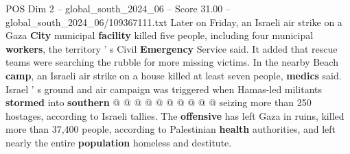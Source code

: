 \begin{textsample}{POS Dim 2 – global\_south\_2024\_06 – Score 31.00 – global\_south\_2024\_06/109367111.txt}
Later on Friday, an Israeli air strike on a Gaza \textbf{City} municipal \textbf{facility} killed five people, including four municipal \textbf{workers}, the territory ' s Civil \textbf{Emergency} Service said.
It added that rescue teams were searching the rubble for more missing victims.
In the nearby Beach \textbf{camp}, an Israeli air strike on a house killed at least seven people, \textbf{medics} said.
Israel ' s ground and air campaign was triggered when Hamas-led militants \textbf{stormed} into \textbf{southern} @ @ @ @ @ @ @ @ @ @ seizing more than 250 hostages, according to Israeli tallies.
The \textbf{offensive} has left Gaza in ruins, killed more than 37,400 people, according to Palestinian \textbf{health} authorities, and left nearly the entire \textbf{population} homeless and destitute.

\end{textsample}
